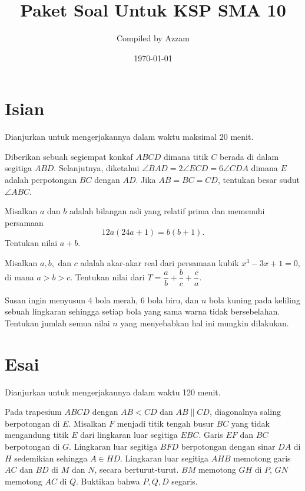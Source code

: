 \documentclass[12pt]{scrartcl}
\begin{document}
	\title{Paket Soal Untuk KSP SMA 10} %
	\date{\today}
	\author{Compiled by Azzam}
	\maketitle

\renewcommand*\contentsname{Daftar Isi}
\tableofcontents

\newpage
	
	\section{Isian}
	Dianjurkan untuk mengerjakannya dalam waktu maksimal 20 menit.
	\begin{soalbaru} 
			
		Diberikan sebuah segiempat konkaf $ABCD$ dimana titik $C$ berada di dalam segitiga $ABD$. Selanjutnya, diketahui $\angle BAD = 2\angle ECD = 6\angle CDA$ dimana $E$ adalah perpotongan $BC$ dengan $AD$. Jika $AB=BC=CD$, tentukan besar sudut $\angle ABC$.
				\end{soalbaru}
				
	\begin{soalbaru}
	Misalkan $a$ dan $b$ adalah bilangan asli yang relatif prima dan memenuhi persamaan
	$$12a(24a+1)=b(b+1).$$
	Tentukan nilai $a+b$.
	\end{soalbaru}
	
	\begin{soalbaru}
	Misalkan $a,b,$ dan $c$ adalah akar-akar real dari persamaan kubik $x^3-3x+1=0$, di mana $a>b>c$. Tentukan nilai dari
	$T = \dfrac{a}{b}+\dfrac{b}{c}+\dfrac{c}{a}.$
	\end{soalbaru}
	
	\begin{soalbaru}
	Susan ingin menyusun $4$ bola merah, 6 bola biru, dan $n$ bola kuning pada keliling sebuah lingkaran sehingga setiap bola yang sama warna tidak bersebelahan. Tentukan jumlah semua nilai $n$ yang menyebabkan hal ini mungkin dilakukan.
	\end{soalbaru}
	
	\newpage
	\section{Esai}
	Dianjurkan untuk mengerjakannya dalam waktu 120 menit.
	
	
	
		
		\begin{soalbaru}
				Pada trapesium $ABCD$ dengan $AB<CD$ dan $AB \parallel CD$, diagonalnya saling berpotongan di $E$. Misalkan $F$ menjadi titik tengah busur $BC$ yang tidak mengandung titik $E$ dari lingkaran luar segitiga $EBC$. Garis $EF$ dan $BC$ berpotongan di $G$. Lingkaran luar segitiga $BFD$ berpotongan dengan sinar $DA$ di $H$ sedemikian sehingga $A \in HD$. Lingkaran luar segitiga $AHB$ memotong garis $AC$ dan $BD$ di $M$ dan $N$, secara berturut-turut. $BM$ memotong $GH$ di $P$, $GN$ memotong $AC$ di $Q$. Buktikan bahwa $P, Q, D$ segaris.
			\end{soalbaru}
\end{document}
